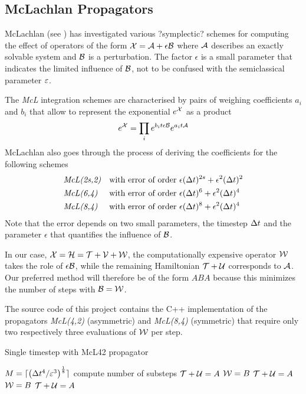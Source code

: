 \subsection{McLachlan Propagators}
\label{sub:mcl_propagator}
%
McLachlan (see \cite{McLachlan1995}) has investigated various ?symplectic? schemes for computing the effect of operators of the form $\mathcal{X} = \mathcal{A} + \epsilon \mathcal{B}$ where $\mathcal{A}$ describes an exactly solvable system and $\mathcal{B}$ is a perturbation.
The factor $\epsilon$ is a small parameter that indicates the limited influence of $\mathcal{B}$, not to be confused with the semiclassical parameter $\varepsilon$.
\par\medskip
The \emph{McL} integration schemes are characterised by pairs of weighing coefficients $a_i$ and $b_i$ that allow to represent the exponential $e^{\mathcal{X}}$ as a product
%
\begin{align}
	e^{\mathcal{X}} = \prod_i e^{b_i t \epsilon \mathcal{B}} e^{a_i t \mathcal{A}}
\end{align}
%
McLachlan also goes through the process of deriving the coefficients for the following schemes
\begin{align*}
	&\text{\emph{McL(2s,2)}} &&\text{with error of order } \epsilon (\Delta t)^{2s} + \epsilon^2 (\Delta t)^2 \\
	&\text{\emph{McL(6,4)}} &&\text{with error of order } \epsilon (\Delta t)^{6} + \epsilon^2 (\Delta t)^4 \\
	&\text{\emph{McL(8,4)}} &&\text{with error of order } \epsilon (\Delta t)^{8} + \epsilon^2 (\Delta t)^4
\end{align*}
%
Note that the error depends on two small parameters, the timestep $\Delta t$ and the parameter $\epsilon$ that quantifies the influence of $\mathcal{B}$.
\par\medskip
%
In our case, $\mathcal{X} = \mathcal{H} = \mathcal{T} + \mathcal{V} + \mathcal{W}$, the computationally expensive operator $\mathcal{W}$ takes the role of $\epsilon \mathcal{B}$, while the remaining Hamiltonian $\mathcal{T} + \mathcal{U}$ corresponds to $\mathcal{A}$. 
Our preferred method will therefore be of the form $ABA$ because this minimizes the number of steps with $\mathcal{B} = \mathcal{W}$.
\par\medskip
%
The source code of this project contains the C++ implementation of the propagators \emph{McL(4,2)} (asymmetric) and \emph{McL(8,4)} (symmetric) that require only two respectively three evaluations of $\mathcal{W}$ per step.

\begin{algorithm}[h]
	\caption{Single timestep with McL42 propagator}
	\label{alg:mcl}
	\begin{algorithmic}
		\State
		\State
			\State $M = \lceil \left( \Delta t^4 / \varepsilon^3 \right)^{\frac{1}{8}} \rceil$
			\Comment compute number of substeps
			\State {}
			\Comment $\mathcal{T} + \mathcal{U} = A$
			\State {}
			\Comment $\mathcal{W} = B$
			\State {}
			\Comment $\mathcal{T} + \mathcal{U} = A$
			\State {}
			\Comment $\mathcal{W} = B$
			\State {}
			\Comment $\mathcal{T} + \mathcal{U} = A$
		\State
		\EndProcedure
	\end{algorithmic}
\end{algorithm}
